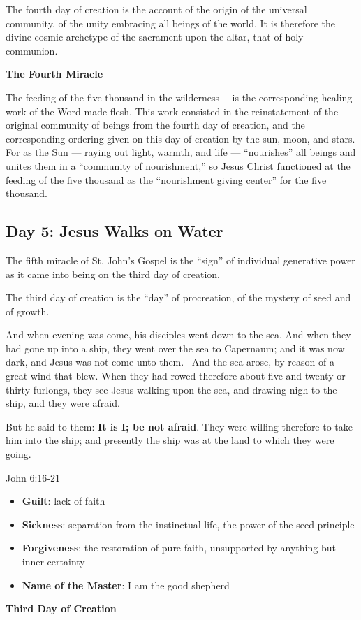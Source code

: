 The fourth day of creation is the account of the origin of the universal community, of the unity embracing all beings of
the world. It is therefore the divine cosmic archetype of the sacrament upon the altar, that of holy communion.

\textbf{The Fourth Miracle}

The feeding of the five thousand in the wilderness —is the corresponding healing work of the Word
made flesh. This work consisted in the reinstatement of the original community of beings from the fourth day of
creation, and the corresponding ordering given on this day of creation by the sun, moon, and stars. For as the Sun
— raying out light, warmth, and life — “nourishes” all beings and unites them
in a “community of nourishment,” so Jesus Christ functioned at the feeding of the five thousand as the “nourishment
giving center” for the five thousand.

\subsection*{Day 5: Jesus Walks on Water}
The fifth miracle of St. John's Gospel is the “sign” of individual generative power as it came into
being on the third day of creation.

The third day of creation is the “day” of procreation, of the mystery of seed and of growth.

And when evening was come, his disciples went down to the sea. And when they had gone up into a ship, they went over the
sea to Capernaum; and it was now dark, and Jesus was not come unto them.  And the sea arose, by reason of a great wind
that blew. When they had rowed therefore about five and twenty or thirty furlongs, they see Jesus walking upon the sea,
and drawing nigh to the ship, and they were afraid.

But he said to them: \textbf{It is I; be not afraid}. They were willing therefore to take him into the ship; and
presently the ship was at the land to which they were going. \begin{flushright} John 6:16-21\end{flushright}

\begin{itemize}
\item \textbf{Guilt}: lack of faith 
\item \textbf{Sickness}: separation from the instinctual life, the power of the seed principle 
\item \textbf{Forgiveness}: the restoration of pure faith, unsupported by anything but inner certainty 
\item \textbf{Name of the Master}: I am the good shepherd 
\end{itemize}
\textbf{Third Day of Creation}

